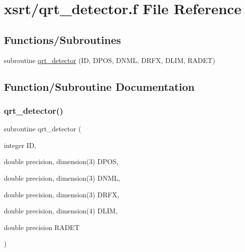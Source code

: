 \hypertarget{qrt__detector_8f}{}\section{xsrt/qrt\+\_\+detector.f File Reference}
\label{qrt__detector_8f}
\subsection*{Functions/\+Subroutines}
\begin{DoxyCompactItemize}
\item 
subroutine \hyperlink{qrt__detector_8f_ae2b3d6825b09ee1f50775c9ce91a253c}{qrt\+\_\+detector} (ID, D\+P\+OS, D\+N\+ML, D\+R\+FX, D\+L\+IM, R\+A\+D\+ET)
\end{DoxyCompactItemize}


\subsection{Function/\+Subroutine Documentation}
\mbox{\label{qrt__detector_8f_ae2b3d6825b09ee1f50775c9ce91a253c}} 
\subsubsection{\texorpdfstring{qrt\+\_\+detector()}{qrt\_detector()}}
{\footnotesize\ttfamily subroutine qrt\+\_\+detector (\begin{DoxyParamCaption}\item[{integer}]{ID,  }\item[{double precision, dimension(3)}]{D\+P\+OS,  }\item[{double precision, dimension(3)}]{D\+N\+ML,  }\item[{double precision, dimension(3)}]{D\+R\+FX,  }\item[{double precision, dimension(4)}]{D\+L\+IM,  }\item[{double precision}]{R\+A\+D\+ET }\end{DoxyParamCaption})}

